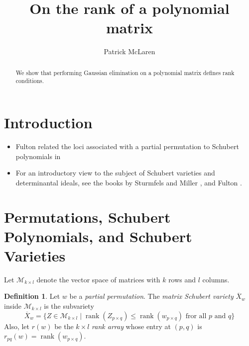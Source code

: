 \documentclass{amsart}
\theoremstyle{definition}
\newtheorem{definition}[theorem]{Definition}
\theoremstyle{remark}
\DeclareMathOperator{\rank}{rank}
\numberwithin{equation}{section}
\begin{document}
\title{On the rank of a polynomial matrix}
\author{Patrick McLaren}

\begin{abstract}
  We show that performing Gaussian elimination on a polynomial matrix defines rank conditions.
\end{abstract}

\maketitle


\section{Introduction}

\begin{itemize}
\item Fulton related the loci associated with a partial permutation to Schubert polynomials in \cite{fulton1992}
\item For an introductory view to the subject of Schubert varieties and determinantal ideals, see the books by Sturmfels and Miller \cite{miller2005combinatorial}, and Fulton \cite{fulton1998schubert}.
\end{itemize}

\section{Permutations, Schubert Polynomials, and Schubert Varieties}

Let $\mathcal{M}_{k \times l}$ denote the vector space of matrices with $k$ rows and $l$ columns.

\begin{definition}
  Let $w$ be a \emph{partial permutation}. The \emph{matrix Schubert variety} $\overline{X}_w$ inside $\mathcal{M}_{k \times l}$ is the subvariety
  \begin{equation*}
    \overline{X}_w = \{ Z \in \mathcal{M}_{k \times l} \mid \rank(Z_{p \times q}) \leq \rank(w_{p \times q}) \text{ fror all $p$ and $q$} \}
  \end{equation*}
  Also, let $r(w)$ be the $k \times l$ \emph{rank array} whose entry at $(p, q)$ is $r_{pq}(w) = \rank(w_{p \times q})$.
\end{definition}
\end{document}
